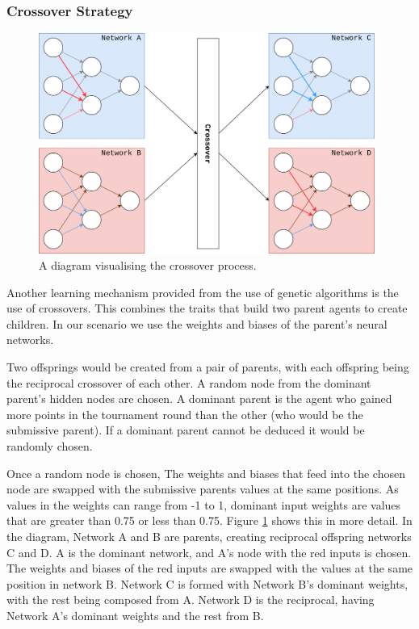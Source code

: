 \documentclass[12pt,a4paper]{article}
\begin{document}
        \subsubsection{Crossover Strategy} \label{crossover_strategy}

                
            \begin{figure}
                \centering
                \includegraphics[width=110mm]{crossover.png}
                \caption{A diagram visualising the crossover process.\label{crossoverpic}}
            \end{figure}

            Another learning mechanism provided from the use of genetic algorithms is the use of crossovers. This combines the traits that build two parent agents to create children. In our scenario we use the weights and biases of the parent's neural networks.

            Two offsprings would be created from a pair of parents, with each offspring being the reciprocal crossover of each other. 
            A random node from the dominant parent's hidden nodes are chosen. A dominant parent is the agent who gained more points in the tournament round than the other (who would be the submissive parent). If a dominant parent cannot be deduced it would be randomly chosen. 
            
            Once a random node is chosen, The weights and biases that feed into the chosen node are swapped with the submissive parents values at the same positions. As values in the weights can range from -1 to 1, dominant input weights are values that are greater than 0.75 or less than 0.75. 
            Figure \ref{crossoverpic} shows this in more detail. In the diagram, Network A and B are parents, creating reciprocal offspring networks C and D. A is the dominant network, and A's node with the red inputs is chosen. The weights and biases of the red inputs are swapped with the values at the same position in network B. Network C is formed with Network B's dominant weights, with the rest being composed from A. Network D is the reciprocal, having Network A's dominant weights and the rest from B.
\end{document}
